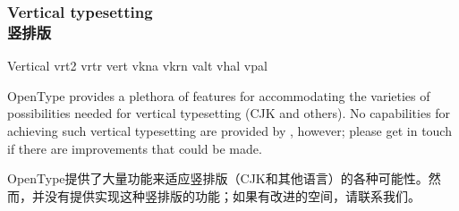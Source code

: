 \documentclass[a4paper]{l3doc}
\begin{document}
\subsubsection{Vertical typesetting\\竖排版}

\begin{features}{Vertical}
         {vrt2}
 {vrtr}
            {vert}
        {vkna}
               {vkrn}
      {valt}
           {vhal}
   {vpal}
\end{features}

OpenType provides a plethora of features for accommodating the varieties of possibilities
needed for vertical typesetting (CJK and others).
No capabilities for achieving such vertical typesetting are provided by ,
however; please get in touch if there are improvements that could be made.

OpenType提供了大量功能来适应竖排版（CJK和其他语言）的各种可能性。然而，并没有提供实现这种竖排版的功能；如果有改进的空间，请联系我们。
\end{document}
